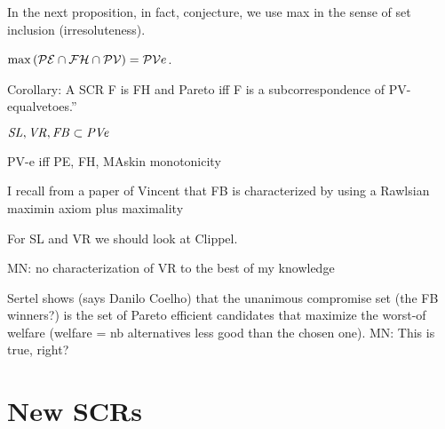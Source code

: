 \documentclass[version=3.21, pagesize, twoside=off, bibliography=totoc, DIV=calc, fontsize=12pt, a4paper]{scrartcl}
\begin{document}
In the next proposition, in fact, conjecture, we use max in the sense of set inclusion (irresoluteness).
\begin{proposition}
	$\max {(\mathcal{PE}\cap \mathcal{FH}\cap \mathcal{PV})} = \mathcal{PV}e$.
\end{proposition}

Corollary: A SCR F is FH and Pareto iff F is a subcorrespondence of PV-equalvetoes.”





\begin{proposition}
	$\mathit{SL}, \mathit{VR}, \mathit{FB} \subset \mathit{PVe}$
\end{proposition}



PV-e iff PE, FH, MAskin monotonicity

I recall from a paper of Vincent that FB is characterized by using a Rawlsian maximin axiom plus maximality 

For SL and VR we should look at Clippel. 

\color{green} MN: no characterization of VR to the best of my knowledge \color{black}

Sertel shows (says Danilo Coelho) that the unanimous compromise set (the FB winners?) is the set of Pareto efficient candidates that maximize the worst-of welfare (welfare = nb alternatives less good than the chosen one). \color{green} MN: This is true, right? \color{black}



\section{New SCRs}
\end{document}
